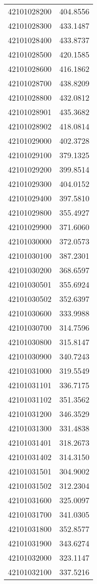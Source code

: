 \begin{longtable}[t]{lr}
42101028200 & 404.8556\\
42101028300 & 433.1487\\
42101028400 & 433.8737\\
42101028500 & 420.1585\\
42101028600 & 416.1862\\
42101028700 & 438.8209\\
42101028800 & 432.0812\\
42101028901 & 435.3682\\
42101028902 & 418.0814\\
42101029000 & 402.3728\\
42101029100 & 379.1325\\
42101029200 & 399.8514\\
42101029300 & 404.0152\\
42101029400 & 397.5810\\
42101029800 & 355.4927\\
42101029900 & 371.6060\\
42101030000 & 372.0573\\
42101030100 & 387.2301\\
42101030200 & 368.6597\\
42101030501 & 355.6924\\
42101030502 & 352.6397\\
42101030600 & 333.9988\\
42101030700 & 314.7596\\
42101030800 & 315.8147\\
42101030900 & 340.7243\\
42101031000 & 319.5549\\
42101031101 & 336.7175\\
42101031102 & 351.3562\\
42101031200 & 346.3529\\
42101031300 & 331.4838\\
42101031401 & 318.2673\\
42101031402 & 314.3150\\
42101031501 & 304.9002\\
42101031502 & 312.2304\\
42101031600 & 325.0097\\
42101031700 & 341.0305\\
42101031800 & 352.8577\\
42101031900 & 343.6274\\
42101032000 & 323.1147\\
42101032100 & 337.5216\\

\end{longtable}

